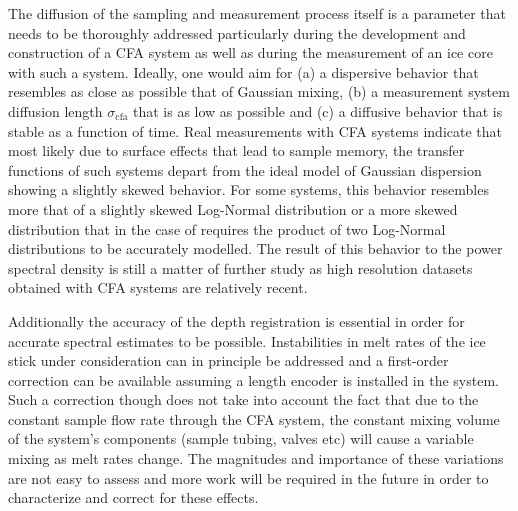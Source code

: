 \documentclass[11pt, draftcls, onecolumn]{IEEEtran} %
\numberwithin{equation}{section}
\numberwithin{table}{section}
\numberwithin{figure}{section}
\begin{document}
The diffusion of the sampling and measurement process itself is a parameter that needs to be 
thoroughly addressed particularly during the development and construction of a CFA system
as well as during the measurement of an ice core with such a system.
Ideally, one would aim for (a) a dispersive behavior  that resembles as close as possible that of Gaussian
mixing, (b) a measurement system diffusion length $\sigma_{\mathrm{cfa}}$ that is as low as possible
and (c) a diffusive behavior that is stable as a function of time.
Real measurements with CFA systems indicate that most likely due to surface effects
that lead to sample memory, the transfer functions of such systems depart from the ideal model of
Gaussian dispersion showing a slightly skewed behavior. 
For some systems, this behavior resembles more that of a slightly skewed Log-Normal distribution \citep{Gkinis2011, Maselli2013, Emanuelsson2015}
or a more skewed distribution that in the case of \citet{Jones2017a} requires the product of two Log-Normal distributions to be accurately modelled.
The result of this behavior to the power spectral density is still a matter of further study as high resolution datasets obtained with CFA systems 
are relatively recent.

Additionally the accuracy of the depth registration is essential in order for accurate spectral estimates to be possible.
Instabilities in melt rates of the ice stick under consideration can in principle be addressed  and a first-order correction
can be available assuming a length encoder is installed in the system.
Such a correction though does not take into account the fact that due to the constant sample flow rate through the CFA system,
the constant mixing volume of the system's components (sample tubing, valves etc) will cause a variable mixing as melt rates change.
The magnitudes and importance of these variations are not easy to assess and more work will be required in the future in order 
to characterize and correct for these effects.
\end{document}
